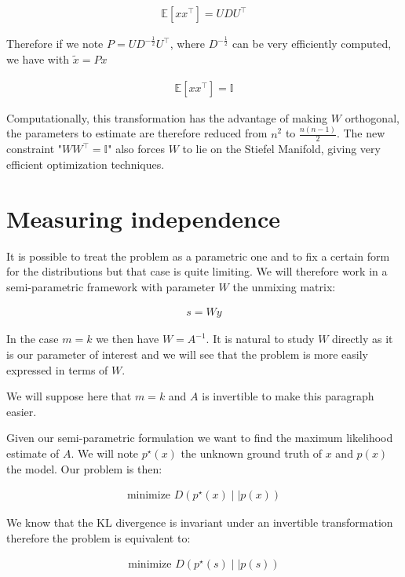 \documentclass[a4paper,BCOR=5mm,oneside,openany]{scrreprt}
\begin{document}
\begin{align*}
	\mathbb{E} \left[ x x^\intercal \right] = U D U^\intercal
\end{align*}

Therefore if we note $P = U D^{-\frac{1}{2}} U^\intercal$, where $D^{-\frac{1}{2}}$ can be very efficiently computed, we have with $\tilde{x} = P x$

\begin{align*}
	\mathbb{E} \left[ x x^\intercal \right] = \mathbb{I}
\end{align*}

Computationally, this transformation has the advantage of making $W$ orthogonal, the parameters to estimate are therefore reduced from $n^2$ to $\frac{n (n-1)}{2}$. The new constraint "$W W^\intercal = \mathbb{I}$" also forces $W$ to lie on the Stiefel Manifold, giving very efficient optimization techniques.

\chapter{Measuring independence}

It is possible to treat the problem as a parametric one and to fix a certain form for the distributions but that case is quite limiting. We will therefore work in a semi-parametric framework with parameter $W$ the unmixing matrix:

\begin{align*}
	s = W y
\end{align*}

In the case $m = k$ we then have $W = A^{-1}$. It is natural to study $W$ directly as it is our parameter of interest and we will see that the problem is more easily expressed in terms of $W$.

We will suppose here that $m = k$ and $A$ is invertible to make this paragraph easier.

Given our semi-parametric formulation we want to find the maximum likelihood estimate of $A$. We will note $p^\star (x)$ the unknown ground truth of $x$ and $p(x)$ the model. Our problem is then:

\begin{align*}
	\text{minimize } D \left(p^\star(x) \mid \mid p(x) \right)
\end{align*}

We know that the KL divergence is invariant under an invertible transformation therefore the problem is equivalent to:

\begin{align*}
	\text{minimize } D \left(p^\star(s) \mid \mid p(s) \right)
\end{align*}
\end{document}
